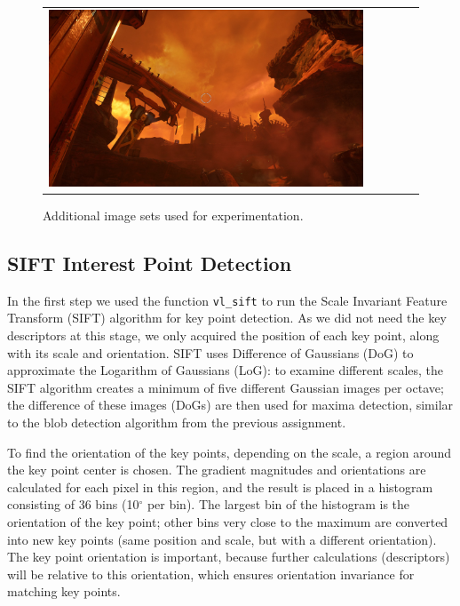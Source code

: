 \begin{figure}[h]
\begin{tabular}{ccccc}
	\includegraphics[width=\mywidth]{figures/doom3.jpg} \\

	\end{tabular}
	\caption{Additional image sets used for experimentation.}
	\label{fig:a4:imagesets}
\end{figure}

\subsection{SIFT Interest Point Detection}

In the first step we used the function \texttt{vl\_sift} to run the Scale Invariant Feature Transform (SIFT) \cite{Lowe04} algorithm for key point detection. As we did not need the key descriptors at this stage, we only acquired the position of each key point, along with its scale and orientation. SIFT uses Difference of Gaussians (DoG) to approximate the Logarithm of Gaussians (LoG): to examine different scales, the SIFT algorithm creates a minimum of five different Gaussian images per octave; the difference of these images (DoGs) are then used for maxima detection, similar to the blob detection algorithm from the previous assignment. 

To find the orientation of the key points, depending on the scale, a region around the key point center is chosen. The gradient magnitudes and orientations are calculated for each pixel in this region, and the result is placed in a histogram consisting of 36 bins (10$^\circ$ per bin). The largest bin of the histogram is the orientation of the key point; other bins very close to the maximum are converted into new key points (same position and scale, but with a different orientation). The key point orientation is important, because further calculations (descriptors) will be relative to this orientation, which ensures orientation invariance for matching key points.

